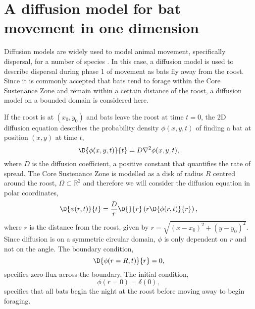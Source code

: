 \section{A diffusion model for bat movement in one dimension} \label{diffusion}

Diffusion models are widely used to model animal movement, specifically dispersal, for a number of
species \cite{Ovaskainen2016}. In this case, a diffusion model is used to
describe dispersal during phase 1 of movement as bats fly away from the roost. Since it is commonly accepted that bats tend
to forage within the Core Sustenance Zone and remain within a certain distance
 of the roost, a diffusion model on a bounded domain is considered here.

If the roost is at $(x_0,y_0)$ and bats leave the roost at time $t =0$,
the 2D diffusion equation describes the probability density $\phi(x,y,t)$ of
finding a bat at position $(x,y)$ at time $t$,
%
\begin{equation}
  \D{\phi(x,y,t)}{t} = D \nabla^2 \phi(x,y,t) ,
  \label{eqn:diffusion_cartesian}
\end{equation}
%
where $D$ is the diffusion coefficient, a positive constant that quantifies the
 rate of spread. The Core Sustenance Zone is modelled as a disk of radius $R$ centred around the roost, $\Omega \subset \mathbb{R}^2$ and therefore we will consider the diffusion equation in polar coordinates,
 \begin{equation}
 \D{ \phi(r,t)}{t} = \frac{D}{r} \D{}{ r} \left( r \D{\phi(r,t)}{r} \right),
 \label{eqn:diffusion_polar}
 \end{equation}
 where $r$ is the distance from the roost, given by $r=\sqrt{(x-x_0)^2 +
 (y-y_0)^2}$. Since diffusion is on a symmetric circular domain, $\phi$ is only dependent on $r$ and not
  on the angle. The boundary condition,
%
\begin{equation}
  \D{\phi(r=R,t)}{r} = 0,
\end{equation}
%
specifies zero-flux across the boundary. The initial condition,
%
 \begin{equation}
 \phi(r = 0) = \delta(0),
 \label{eqn:IC}
 \end{equation}
%
specifies that all bats begin the night at the roost before moving away to begin foraging.

